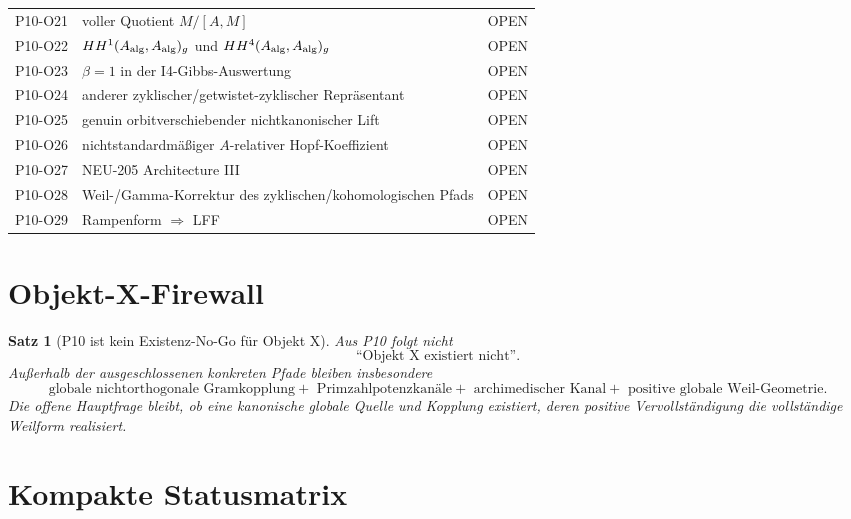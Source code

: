 \documentclass[11pt,a4paper]{amsart}
\newtheorem{theorem}{Satz}[section]
\begin{document}
\begin{longtable}{>{\raggedright\arraybackslash}p{}
                  >{\raggedright\arraybackslash}p{}
                  >{\raggedright\arraybackslash}p{}}
P10-O21 & voller Quotient $M/[A,M]$ & OPEN\\
P10-O22 & $HH^1(A_{\rm alg},A_{\rm alg})_g$ und $HH^4(A_{\rm alg},A_{\rm alg})_g$ & OPEN\\
P10-O23 & $\beta=1$ in der I4-Gibbs-Auswertung & OPEN\\
P10-O24 & anderer zyklischer/getwistet-zyklischer Repräsentant & OPEN\\
P10-O25 & genuin orbitverschiebender nichtkanonischer Lift & OPEN\\
P10-O26 & nichtstandardmäßiger $A$-relativer Hopf-Koeffizient & OPEN\\
P10-O27 & NEU-205 Architecture III & OPEN\\
P10-O28 & Weil-/Gamma-Korrektur des zyklischen/kohomologischen Pfads & OPEN\\
P10-O29 & Rampenform $\Rightarrow$ LFF & OPEN\\
\bottomrule
\end{longtable}
\normalsize

\section{Objekt-X-Firewall}

\begin{theorem}[P10 ist kein Existenz-No-Go für Objekt X]\label{thm:objectx-firewall}
Aus P10 folgt nicht
\[
  \text{``Objekt X existiert nicht''.}
\]
Außerhalb der ausgeschlossenen konkreten Pfade bleiben insbesondere
\[
  \boxed{
  \text{globale nichtorthogonale Gramkopplung}
  +\text{ Primzahlpotenzkanäle}
  +\text{ archimedischer Kanal}
  +\text{ positive globale Weil-Geometrie}.}
\]
Die offene Hauptfrage bleibt, ob eine kanonische globale Quelle und Kopplung
existiert, deren positive Vervollständigung die vollständige Weilform
realisiert.
\end{theorem}

\section{Kompakte Statusmatrix}
\end{document}

